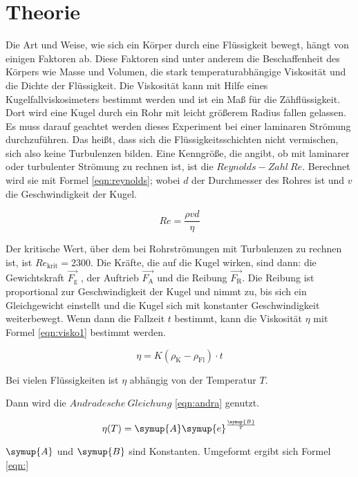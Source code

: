 \section{Theorie}
\label{sec:Theorie}

Die Art und Weise, wie sich ein Körper durch eine Flüssigkeit
bewegt, hängt von einigen Faktoren ab. Diese Faktoren sind unter anderem
 die Beschaffenheit des Körpers wie Masse und Volumen, die stark temperaturabhängige
Viskosität und die Dichte der Flüssigkeit.
Die  Viskosität kann mit Hilfe eines Kugelfallviskosimeters bestimmt werden und
ist ein Maß für die Zähflüssigkeit.
Dort wird eine Kugel durch ein Rohr mit leicht größerem Radius fallen gelassen.
Es muss darauf geachtet werden dieses Experiment bei einer laminaren
Strömung durchzuführen. Das heißt, dass sich die Flüssigkeitsschichten nicht
vermischen, sich also keine Turbulenzen bilden.
Eine Kenngröße, die angibt, ob mit laminarer oder turbulenter Strömung
zu rechnen ist, ist die $Reynolds-Zahl~Re$. Berechnet wird sie mit Formel
\eqref{eqn:reynolds}; wobei $d$ der Durchmesser des Rohres ist und $v$
die Geschwindigkeit der Kugel.

\begin{equation}
  Re = \frac{\rho v d}{\eta}
  \label{eqn:reynolds}
\end{equation}

Der kritische Wert, über dem bei Rohrströmungen mit Turbulenzen zu rechnen
ist, ist $Re_{\text{krit}} = 2300$.
Die Kräfte, die auf die Kugel wirken, sind dann: die Gewichtskraft $\vec{F_{\text{g}}}$
, der Auftrieb $\vec{F_{\text{A}}}$ und die Reibung $\vec{F_{\text{R}}}$.
Die Reibung ist proportional zur Geschwindigkeit der Kugel und nimmt zu, bis
sich ein Gleichgewicht einstellt und die Kugel sich mit konstanter Geschwindigkeit
weiterbewegt.
Wenn dann die Fallzeit $t$ bestimmt, kann die Viskosität $\eta$ mit Formel
\eqref{eqn:visko1} bestimmt werden.

\begin{equation}
  \eta = K (\rho_{\text{K}}-\rho_{\text{Fl}}) \cdot t
  \label{eqn:visko1}
\end{equation}

Bei vielen Flüssigkeiten ist $\eta$ abhängig von der Temperatur $T$.

Dann
wird die $Andradesche~Gleichung$ \eqref{eqn:andra} genutzt.

\begin{equation}
  \eta(T) = \symup{A} \symup{e}^{\frac{\symup{B}}{T}}
  \label{eqn:andra}
\end{equation}

$\symup{A}$ und $\symup{B}$ sind Konstanten.
Umgeformt ergibt sich Formel \eqref{eqn:}
\begin{equation}

\end{equation}
